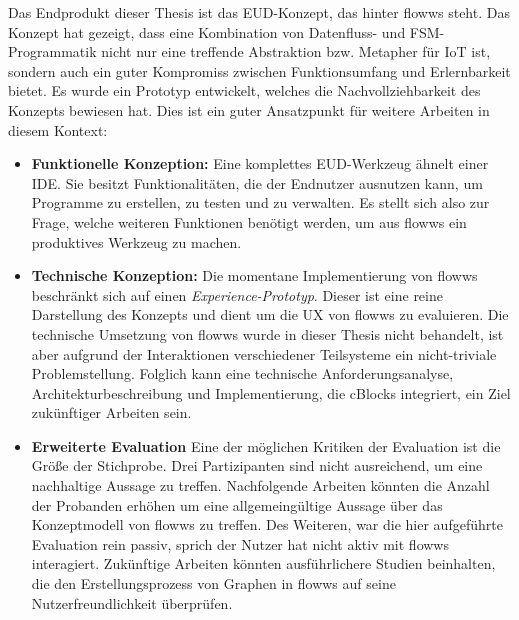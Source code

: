 Das Endprodukt dieser Thesis ist das \ac{EUD}-Konzept, das hinter flowws steht. Das Konzept hat gezeigt, dass eine Kombination von Datenfluss- und \ac{FSM}-Pro\-gram\-ma\-tik nicht nur eine treffende Abstraktion bzw. Metapher für \ac{IoT} ist, sondern auch ein guter Kompromiss zwischen Funktionsumfang und Erlernbarkeit bietet. Es wurde ein Prototyp entwickelt, welches die Nachvollziehbarkeit des Konzepts bewiesen hat. Dies ist ein guter Ansatzpunkt für weitere Arbeiten in diesem Kontext:

\begin{itemize}
    \item \textbf{Funktionelle Konzeption:} Eine komplettes \ac{EUD}-Werkzeug ähnelt einer \ac{IDE}. Sie besitzt Funktionalitäten, die der Endnutzer ausnutzen kann, um Programme zu erstellen, zu testen und zu verwalten. Es stellt sich also zur Frage, welche weiteren Funktionen benötigt werden, um aus flowws ein produktives Werkzeug zu machen.
    
    \item \textbf{Technische Konzeption:} Die momentane Implementierung von flowws beschränkt sich auf einen \textit{Experience-Prototyp}. Dieser ist eine reine Darstellung des Konzepts und dient um die \ac{UX} von flowws zu evaluieren. Die technische Umsetzung von flowws wurde in dieser Thesis nicht behandelt, ist aber aufgrund der Interaktionen verschiedener Teilsysteme ein nicht-triviale Problemstellung. Folglich kann eine technische Anforderungsanalyse, Architekturbeschreibung und Implementierung, die cBlocks integriert, ein Ziel zukünftiger Arbeiten sein. 
    
    \item \textbf{Erweiterte Evaluation} Eine der möglichen Kritiken der Evaluation ist die Größe der Stichprobe. Drei Partizipanten sind nicht ausreichend, um eine nachhaltige Aussage zu treffen. Nachfolgende Arbeiten könnten die Anzahl der Probanden erhöhen um eine allgemeingültige Aussage über das Konzeptmodell von flowws zu treffen. Des Weiteren, war die hier aufgeführte Evaluation rein passiv, sprich der Nutzer hat nicht aktiv mit flowws interagiert. Zukünftige Arbeiten könnten ausführlichere Studien beinhalten, die den Erstellungsprozess von Graphen in flowws auf seine Nutzerfreundlichkeit überprüfen.
\end{itemize}
